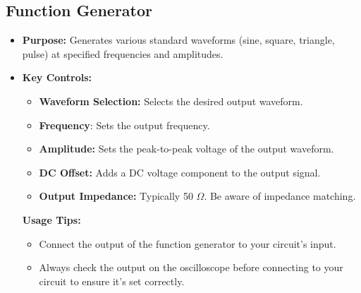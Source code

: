 \subsection*{Function Generator}
\begin{itemize}
	\item \textbf{Purpose:} Generates various standard waveforms (sine, square, triangle, pulse) at
	specified frequencies and amplitudes.
	\item \textbf{Key Controls:}
	\begin{itemize}
		\item \textbf{Waveform Selection:} Selects the desired output waveform.
		\item \textbf{Frequency}: Sets the output frequency.
		\item \textbf{Amplitude:} Sets the peak-to-peak voltage of the output waveform.
		\item \textbf{DC Offset:} Adds a DC voltage component to the output signal.
		\item \textbf{Output Impedance:} Typically 50 $\Omega$. Be aware of impedance matching.
	\end{itemize}
	\textbf{Usage Tips:}
	\begin{itemize}
		\item 	Connect the output of the function generator to your circuit's input.
		\item Always check the output on the oscilloscope before connecting to your circuit to
		ensure it's set correctly.
	\end{itemize}

\end{itemize}

